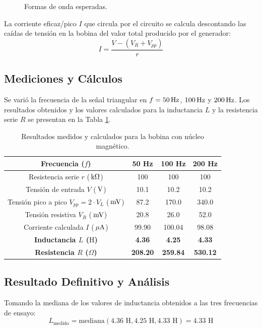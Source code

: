 \begin{figure}[!ht]
    \centering
    
    \caption{Formas de onda esperadas.}
    \label{fig.ej1:ondas_esperadas}
\end{figure}

La corriente eficaz/pico $I$ que circula por el circuito se calcula descontando las caídas de tensión en la bobina del
valor total producido por el generador:
\begin{equation}
    I = \frac{V - (V_R + V_{pp})}{r}
    \label{eq.ej1:calculo_corriente}
\end{equation}

\subsection{Mediciones y Cálculos}
Se varió la frecuencia de la señal triangular en $f = 50\,\mathrm{Hz}$, $100\,\mathrm{Hz}$ y $200\,\mathrm{Hz}$. Los resultados obtenidos y los
valores calculados para la inductancia $L$ y la resistencia serie $R$ se presentan en la Tabla \ref{tab.ej1:mediciones}.

\begin{table}[!ht]
    \centering
    \begin{tabular}{|c|c|c|c|}
        \hline
        \textbf{Frecuencia ($f$)} & \textbf{50 Hz} & \textbf{100 Hz} & \textbf{200 Hz} \\ \hline
        Resistencia serie $r$ ($\,\mathrm{k}\Omega$) & 100 & 100 & 100 \\ \hline
        Tensión de entrada $V$ ($\,\mathrm{V}$) & 10.1 & 10.2 & 10.2 \\ \hline
        Tensión pico a pico $V_{pp} = 2 \cdot V_L$ ($\,\mathrm{mV}$) & 87.2 & 170.0 & 340.0 \\ \hline
        Tensión resistiva $V_R$ ($\,\mathrm{mV}$) & 20.8 & 26.0 & 52.0 \\ \hline
        Corriente calculada $I$ ($\,\mathrm{\mu A}$) & 99.90 & 100.04 & 98.08 \\ \hline
        \textbf{Inductancia $L$ ($\text{H}$)} & \textbf{4.36} & \textbf{4.25} & \textbf{4.33} \\ \hline
        \textbf{Resistencia $R$ ($\Omega$)} & \textbf{208.20} & \textbf{259.84} & \textbf{530.12} \\ \hline
    \end{tabular}
    \caption{Resultados medidos y calculados para la bobina con núcleo magnético.}
    \label{tab.ej1:mediciones}
\end{table}

\subsection{Resultado Definitivo y Análisis}
Tomando la mediana de los valores de inductancia obtenidos a las tres frecuencias de ensayo:
\begin{equation}
    L_{\text{medido}} = \text{mediana}(4.36\text{ H}, 4.25\text{ H}, 4.33\text{ H}) = 4.33\text{ H}
    \label{eq.ej1:mediana_L}
\end{equation}


